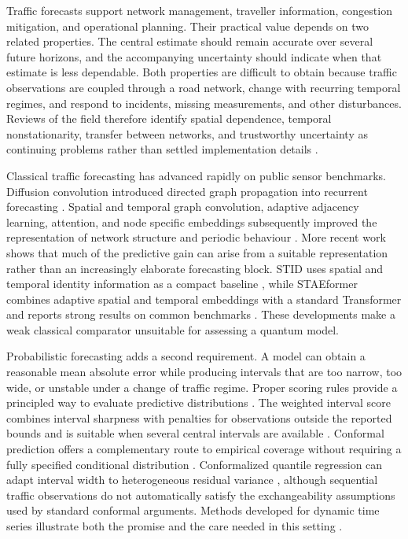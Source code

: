 \documentclass[pdflatex,sn-mathphys-num]{sn-jnl}
\begin{document}
Traffic forecasts support network management, traveller information, congestion mitigation, and operational planning. Their practical value depends on two related properties. The central estimate should remain accurate over several future horizons, and the accompanying uncertainty should indicate when that estimate is less dependable. Both properties are difficult to obtain because traffic observations are coupled through a road network, change with recurring temporal regimes, and respond to incidents, missing measurements, and other disturbances. Reviews of the field therefore identify spatial dependence, temporal nonstationarity, transfer between networks, and trustworthy uncertainty as continuing problems rather than settled implementation details \cite{lana2018road,tedjopurnomo2022survey}.

Classical traffic forecasting has advanced rapidly on public sensor benchmarks. Diffusion convolution introduced directed graph propagation into recurrent forecasting \cite{li2018dcrnn}. Spatial and temporal graph convolution, adaptive adjacency learning, attention, and node specific embeddings subsequently improved the representation of network structure and periodic behaviour \cite{yu2018stgcn,wu2019graphwavenet,bai2020agcrn,guo2019astgcn,zheng2020gman}. More recent work shows that much of the predictive gain can arise from a suitable representation rather than an increasingly elaborate forecasting block. STID uses spatial and temporal identity information as a compact baseline \cite{shao2022stid}, while STAEformer combines adaptive spatial and temporal embeddings with a standard Transformer and reports strong results on common benchmarks \cite{liu2023staeformer}. These developments make a weak classical comparator unsuitable for assessing a quantum model.

Probabilistic forecasting adds a second requirement. A model can obtain a reasonable mean absolute error while producing intervals that are too narrow, too wide, or unstable under a change of traffic regime. Proper scoring rules provide a principled way to evaluate predictive distributions \cite{gneiting2007scoring}. The weighted interval score combines interval sharpness with penalties for observations outside the reported bounds and is suitable when several central intervals are available \cite{bracher2021wis}. Conformal prediction offers a complementary route to empirical coverage without requiring a fully specified conditional distribution \cite{angelopoulos2023conformal}. Conformalized quantile regression can adapt interval width to heterogeneous residual variance \cite{romano2019cqr}, although sequential traffic observations do not automatically satisfy the exchangeability assumptions used by standard conformal arguments. Methods developed for dynamic time series illustrate both the promise and the care needed in this setting \cite{xu2021enbpi}.
\end{document}
